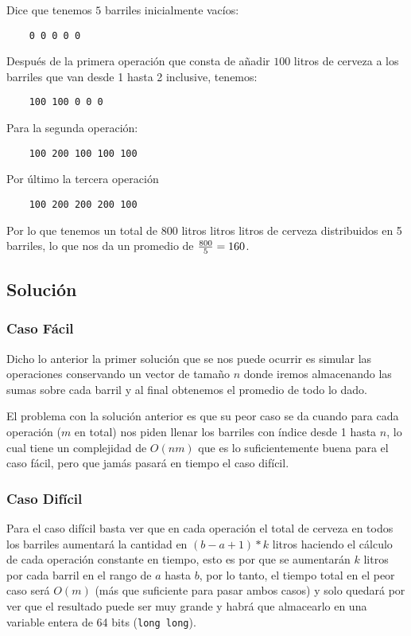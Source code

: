 Dice que tenemos $5$ barriles inicialmente vacíos:

\begin{verbatim}
    0 0 0 0 0
\end{verbatim}

Después de la primera operación que consta de añadir $100$ litros de cerveza
a los barriles que van desde 1 hasta 2 inclusive, tenemos:

\begin{verbatim}
    100 100 0 0 0
\end{verbatim}

Para la segunda operación:

\begin{verbatim}
    100 200 100 100 100  
\end{verbatim}

Por último la tercera operación

\begin{verbatim}
    100 200 200 200 100   
\end{verbatim}

Por lo que tenemos un total de 800 litros litros litros de cerveza distribuidos en
5 barriles, lo que nos da un promedio de ${800 \over 5} = 160$.

\subsection*{Solución}


\subsubsection*{Caso Fácil}
Dicho lo anterior la primer solución que se nos puede ocurrir es simular las
operaciones conservando un vector de tamaño $n$  donde iremos almacenando las
sumas sobre cada barril y al final obtenemos el promedio de todo lo dado.

El problema con la solución anterior es que su peor caso se da cuando para cada
operación ($m$ en total) nos piden llenar los barriles con índice desde 1 hasta $n$,
lo cual tiene un complejidad de $O(nm)$ que es lo suficientemente buena para el caso
fácil, pero que jamás pasará en tiempo el caso difícil.

\subsubsection*{Caso Difícil}
Para el caso difícil basta ver que en cada operación el total de cerveza en todos
los barriles aumentará la cantidad en $(b-a+1)*k$ litros haciendo el cálculo de cada
operación constante en tiempo, esto es por que se aumentarán $k$ litros por cada barril
en el rango de $a$ hasta $b$, por lo tanto, el tiempo total en el peor caso 
será $O(m)$ (más que suficiente para pasar ambos casos) y solo quedará por ver que el 
resultado puede ser muy grande y habrá que almacearlo en una variable 
entera de 64 bits (\texttt{long long}).

